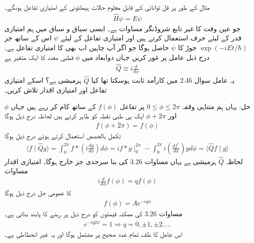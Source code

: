مثال کے طور پر قل توانائی کے قابلِ معلوم حالات ہیملٹونی کے امتیازی تفاعل ہوںگے۔ 
\begin{align}
	\hat{H}\psi = E\psi
\end{align}
جو عین وقت کا غیر تابع شروڈنگر مساوات ہے۔ ایسی سیاق و سباق میں ہم امتیازی قدر کے لیئے حرف  استعمال کرتے ہیں اور امتیازی تفاعل کے لیئے \(\psi\) اس کے ساتھ جز \(\exp(-iEt/\hbar)\) جوڑ کا \(\psi\) حاصل ہوگا جو اگر آپ چاہیں اب بھی  کا امتیازی تفاعل ہے۔
درج ذیل عامل پر غور کریں جہاں دوابعاد میں \(\phi\) قطبی معدد کا ایک متغیر ہے
\begin{align}
	\hat{Q} \equiv i\frac{d}{d\phi}
\end{align}
یہ عامل سوال \num{2.46} میں کارآمد ثابت ہوسکتا تھا کیا \(\hat{Q}\) ہرمیشی ہے؟ اسکے امتیازی تفاعل اور امتیازی اقدار تلاش کریں۔

حل: یہاں ہم متناہی وقفہ \(0\leq\phi\leq 2\pi\) پر تفاعل \(f(\phi)\) کے ساتھ کام کر رہے ہیں جہاں \(\phi\) اور \(\phi+2\pi\) ایک ہی طبی نقطہ کو طاہر کرتے ہیں لحاظہ درج ذیل ہوگا 
\begin{align}
	f(\phi + 2\pi) = f(\phi)
\end{align}
تکمل بالحصص استعمال کرتے ہوئے درج ذیل ہوگا 
\begin{align*}
	\langle f\mid\hat{Q}g \rangle = \int_{0}^{2\pi}f{*}(i\frac{dg}{d\phi})d\phi = if{*}g\mid^{2\pi}_{0} - \int_{0}^{2\pi}i(\frac{df^*}{d\phi})gd\phi = \langle \hat{Q}f\mid g \rangle
\end{align*}
لحاظہ \(\hat{Q}\) ہرمیشی ہے یہاں مساوات \num{3.26} کی بنا سرحدی جز خارج ہوگا۔ امتیازی اقدار مساوات  
\begin{align}
	i\frac{d}{d\phi}f(\phi) = qf(\phi)
\end{align}
کا عمومی حل درج ذیل ہوگا
\begin{align}
	f(\phi) = Ae^{-iq\phi}
\end{align}
مساوات \num{3.26}  کی ممکنہ قیمتوں کو درج ذیل پر رہنے کا پابند بناتی ہے۔
\begin{align}
	e^{-iq2\pi} = 1 \Rightarrow q = 0, \pm1, \pm2, \dots
\end{align}
اس عامل کا طف تمام عدد صحیح پر مشتمل ہوگا اور یہ غیر انحطاطی ہے۔
